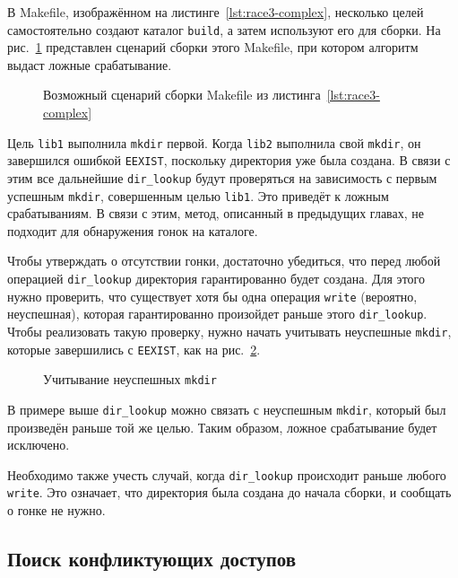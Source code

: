 В Makefile, изображённом на листинге~\ref{lst:race3-complex}, несколько целей самостоятельно создают каталог \texttt{build}, а затем используют его для сборки. На рис.~\ref{fig:false-mkdir-conflict} представлен сценарий сборки этого Makefile, при котором алгоритм выдаст ложные срабатывание.

\begin{figure}[H]
    \centering
    
    \caption{Возможный сценарий сборки Makefile из листинга~\ref{lst:race3-complex}}
    \label{fig:false-mkdir-conflict}
\end{figure}

Цель \texttt{lib1} выполнила \texttt{mkdir} первой. Когда \texttt{lib2} выполнила свой \texttt{mkdir}, он завершился ошибкой \texttt{EEXIST}, поскольку директория уже была создана. В связи с этим все дальнейшие \texttt{dir\_lookup} будут проверяться на зависимость с первым успешным \texttt{mkdir}, совершенным целью \texttt{lib1}. Это приведёт к ложным срабатываниям. В связи с этим, метод, описанный в предыдущих главах, не подходит для обнаружения гонок на каталоге.

Чтобы утверждать о отсутствии гонки, достаточно убедиться, что перед любой операцией \texttt{dir\_lookup} директория гарантированно будет создана. Для этого нужно проверить, что существует хотя бы одна операция \texttt{write} (вероятно, неуспешная), которая гарантированно произойдет раньше этого \texttt{dir\_lookup}. Чтобы реализовать такую проверку, нужно начать учитывать неуспешные \texttt{mkdir}, которые завершились с \texttt{EEXIST}, как на рис.~\ref{fig:false-mkdir-conflict-fixed}.

\begin{figure}[H]
    \centering
    
    \caption{Учитывание неуспешных \texttt{mkdir}}
    \label{fig:false-mkdir-conflict-fixed}
\end{figure}

В примере выше \texttt{dir\_lookup} можно связать с неуспешным \texttt{mkdir}, который был произведён раньше той же целью. Таким образом, ложное срабатывание будет исключено.

Необходимо также учесть случай, когда \texttt{dir\_lookup} происходит раньше любого \texttt{write}. Это означает, что директория была создана до начала сборки, и сообщать о гонке не нужно.

\subsection{Поиск конфликтующих доступов}
\label{subsec:cricital-accesses}

